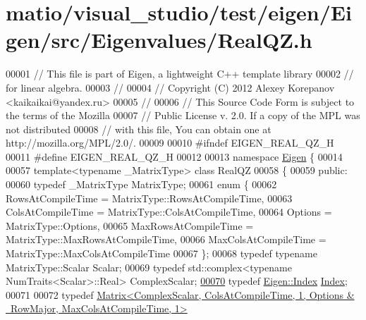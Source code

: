 \hypertarget{matio_2visual__studio_2test_2eigen_2_eigen_2src_2_eigenvalues_2_real_q_z_8h_source}{}\section{matio/visual\+\_\+studio/test/eigen/\+Eigen/src/\+Eigenvalues/\+Real\+QZ.h}
\label{matio_2visual__studio_2test_2eigen_2_eigen_2src_2_eigenvalues_2_real_q_z_8h_source}

\begin{DoxyCode}
00001 \textcolor{comment}{// This file is part of Eigen, a lightweight C++ template library}
00002 \textcolor{comment}{// for linear algebra.}
00003 \textcolor{comment}{//}
00004 \textcolor{comment}{// Copyright (C) 2012 Alexey Korepanov <kaikaikai@yandex.ru>}
00005 \textcolor{comment}{//}
00006 \textcolor{comment}{// This Source Code Form is subject to the terms of the Mozilla}
00007 \textcolor{comment}{// Public License v. 2.0. If a copy of the MPL was not distributed}
00008 \textcolor{comment}{// with this file, You can obtain one at http://mozilla.org/MPL/2.0/.}
00009 
00010 \textcolor{preprocessor}{#ifndef EIGEN\_REAL\_QZ\_H}
00011 \textcolor{preprocessor}{#define EIGEN\_REAL\_QZ\_H}
00012 
00013 \textcolor{keyword}{namespace }\hyperlink{namespace_eigen}{Eigen} \{
00014 
00057   \textcolor{keyword}{template}<\textcolor{keyword}{typename} \_MatrixType> \textcolor{keyword}{class }RealQZ
00058   \{
00059     \textcolor{keyword}{public}:
00060       \textcolor{keyword}{typedef} \_MatrixType MatrixType;
00061       \textcolor{keyword}{enum} \{
00062         RowsAtCompileTime = MatrixType::RowsAtCompileTime,
00063         ColsAtCompileTime = MatrixType::ColsAtCompileTime,
00064         Options = MatrixType::Options,
00065         MaxRowsAtCompileTime = MatrixType::MaxRowsAtCompileTime,
00066         MaxColsAtCompileTime = MatrixType::MaxColsAtCompileTime
00067       \};
00068       \textcolor{keyword}{typedef} \textcolor{keyword}{typename} MatrixType::Scalar Scalar;
00069       \textcolor{keyword}{typedef} std::complex<typename NumTraits<Scalar>::Real> ComplexScalar;
\hyperlink{group___eigenvalues___module_a6201e534e901b5f4e66f72c176b534a3}{00070}       \textcolor{keyword}{typedef} \hyperlink{namespace_eigen_a62e77e0933482dafde8fe197d9a2cfde}{Eigen::Index} \hyperlink{group___eigenvalues___module_a6201e534e901b5f4e66f72c176b534a3}{Index}; 
00071 
00072       \textcolor{keyword}{typedef} 
      \hyperlink{group___core___module}{Matrix<ComplexScalar, ColsAtCompileTime, 1, Options & ~RowMajor, MaxColsAtCompileTime, 1>}

\end{DoxyCode}
